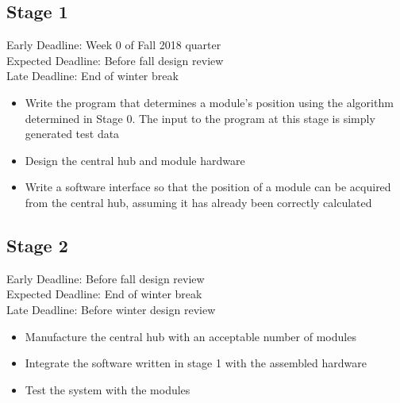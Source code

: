 \documentclass{article}
\begin{document}
\subsection{Stage 1}
Early Deadline: Week 0 of Fall 2018 quarter \\
Expected Deadline: Before fall design review \\
Late Deadline: End of winter break \\
\begin{itemize}
\item Write the program that determines a module's position using the algorithm determined in Stage 0. The input to the program at this stage is simply generated test data
\item Design the central hub and module hardware
\item Write a software interface so that the position of a module can be acquired from the central hub, assuming it has already been correctly calculated
\end{itemize}

\subsection{Stage 2}
Early Deadline: Before fall design review \\
Expected Deadline: End of winter break \\
Late Deadline: Before winter design review \\
\begin{itemize}
\item Manufacture the central hub with an acceptable number of modules
\item Integrate the software written in stage 1 with the assembled hardware
\item Test the system with the modules
\end{itemize}
\end{document}
